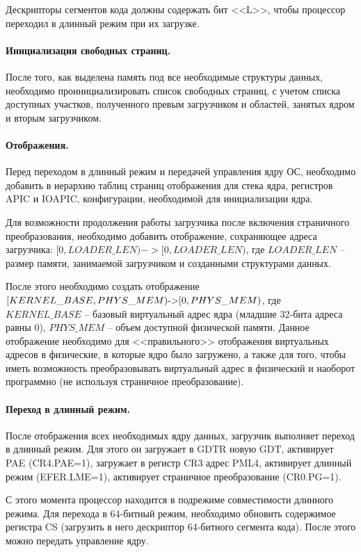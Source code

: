 Дескрипторы сегментов кода должны содержать бит <<L>>, чтобы процессор переходил в длинный
режим при их загрузке.

\paragraph{Инициализация свободных страниц.} После того, как выделена память под все
необходимые структуры данных, необходимо проинициализировать список свободных страниц,
с учетом списка доступных участков, полученного превым загрузчиком и областей,
занятых ядром и вторым загрузчиком.

\paragraph{Отображения.} Перед переходом в длинный режим и передачей управления ядру ОС,
необходимо добавить в иерархию таблиц страниц отображения для стека ядра, регистров APIC и IOAPIC,
конфигурации, необходимой для инициализации ядра.

Для возможности продолжения работы загрузчика после включения страничного преобразования,
необходимо добавить отображение, сохраняющее адреса загрузчика: $[0, LOADER\_LEN) -> [0, LOADER\_LEN)$,
где $LOADER\_LEN$ -- размер памяти, занимаемой загрузчиком и созданными структурами данных.

После этого необходимо создать отображение $[KERNEL\_BASE, PHYS\_MEM) \textup{->} [0, PHYS\_MEM)$,
где $KERNEL\_BASE$ -- базовый виртуальный адрес ядра (младшие 32-бита адреса равны 0), $PHYS\_MEM$ --
объем доступной физической памяти. Данное отображение необходимо для <<правильного>> отображения
виртуальных адресов в физические, в которые ядро было загружено, а также для того, чтобы иметь
возможность преобразовывать виртуальный адрес в физический и наоборот программно (не используя
страничное преобразование).

\paragraph{Переход в длинный режим.} После отображения всех необходимых ядру данных,
загрузчик выполняет переход в длинный режим. Для этого он загружает в GDTR новую GDT,
активирует PAE (CR4.PAE=1), загружает в регистр CR3 адрес PML4, активирует длинный режим
(EFER.LME=1), активирует страничное преобразование (CR0.PG=1).

С этого момента процессор находится в подрежиме совместимости длинного режима.
Для перехода в 64-битный режим, необходимо обновить содержимое регистра CS (загрузить в
него дескриптор 64-битного сегмента кода). После этого можно передать управление ядру.

